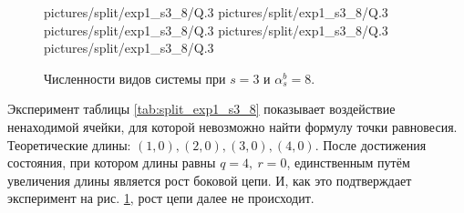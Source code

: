 \begin{figure}[H]
    \centering
       {pictures/split/exp1_s3_8/Q}{.3}
      {pictures/split/exp1_s3_8/Q}{.3}
      {pictures/split/exp1_s3_8/Q}{.3}
      {pictures/split/exp1_s3_8/Q}{.3}
      {pictures/split/exp1_s3_8/Q}{.3}
\caption{Численности видов системы при \(s=3\) и \(\alpha^b_s = 8\).} \label{fig:split_exp1_s3_8}
\end{figure}
Эксперимент таблицы \ref{tab:split_exp1_s3_8} показывает воздействие ненаходимой ячейки, для которой невозможно найти формулу точки равновесия. Теоретические длины: \( (1,0), (2,0), (3,0), (4,0) \). После достижения состояния, при котором длины равны \(q=4, ~ r=0\), единственным путём увеличения длины является рост боковой цепи. И, как это подтверждает эксперимент на рис. \ref{fig:split_exp1_s3_8}, рост цепи далее не происходит. 

